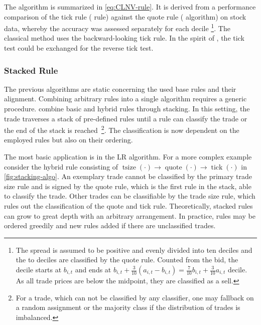 
The algorithm is summarized in \cref{eq:CLNV-rule}. It is derived from a performance comparison of the tick rule ( rule) against the quote rule ( algorithm) on stock data, whereby the accuracy was assessed separately for each decile \footnote{The spread is assumed to be positive and evenly divided into ten deciles and the  to  deciles are classified by the quote rule. Counted from the bid, the  decile starts at $b_{i,t}$ and ends at $b_{i,t} + \tfrac{3}{10} (a_{i,t} - b_{i,t}) = \tfrac{7}{10} b_{i,t} + \tfrac{3}{10} a_{i,t}$  decile. As all trade prices are below the midpoint, they are classified as a sell.}. The classical  method uses the backward-looking tick rule. In the spirit of \textcite[][735]{leeInferringTradeDirection1991}, the tick test could be exchanged for the reverse tick test.

\subsubsection{Stacked Rule}\label{sec:stacked-rule}

The previous algorithms are static concerning the used base rules and their alignment. Combining arbitrary rules into a single algorithm requires a generic procedure. \textcite[][18]{grauerOptionTradeClassification2022} combine basic and hybrid rules through stacking. In this setting, the trade traverses a stack of pre-defined rules until a rule can classify the trade or the end of the stack is reached~\footnote{For a trade, which can not be classified by any classifier, one may fallback on a random assignment or the majority class if the distribution of trades is imbalanced.}. The classification is now dependent on the employed rules but also on their ordering.

The most basic application is in the \gls{LR} algorithm. For a more complex example consider the hybrid rule consisting of $\operatorname{tsize}(\cdot) \to \operatorname{quote}(\cdot) \to \operatorname{tick}(\cdot)$ in \cref{fig:stacking-algo}. An exemplary trade cannot be classified by the primary trade size rule and is signed by the quote rule, which is the first rule in the stack, able to classify the trade. Other trades can be classifiable by the trade size rule, which rules out the classification of the quote and tick rule. Theoretically, stacked rules can grow to great depth with an arbitrary arrangement. In practice, rules may be ordered greedily and new rules added if there are unclassified trades.

